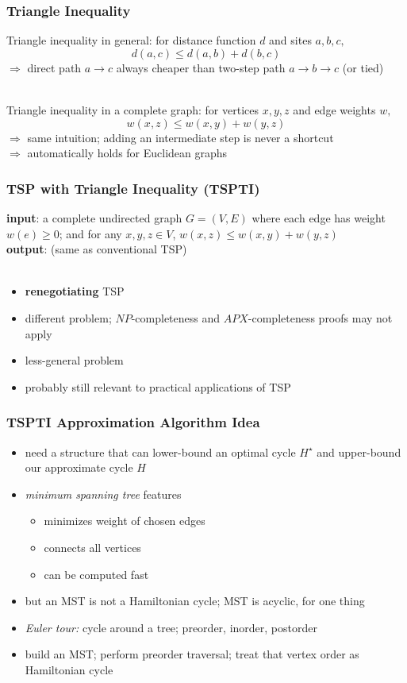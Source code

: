 \documentclass{beamer}
\newcommand{\stanza}{ \\~\ }
\begin{document}
\begin{frame} \frametitle{Triangle Inequality}
Triangle inequality in general: for distance function $d$ and sites $a, b, c,$
\[ d(a, c) \leq d(a, b) + d(b, c) \]
$\Rightarrow$ direct path $a \rightarrow c$ always cheaper than two-step path
$a \rightarrow b \rightarrow c$ (or tied) \stanza

Triangle inequality in a complete graph: for vertices $x, y, z$ and edge weights $w,$
\[ w(x, z) \leq w(x, y) + w(y, z) \]
$\Rightarrow$ same intuition; adding an intermediate step is never a shortcut \\
$\Rightarrow$ automatically holds for Euclidean graphs
\end{frame}

\begin{frame} \frametitle{TSP with Triangle Inequality (TSPTI)}

\textbf{input}: a complete undirected graph $G=(V,E)$ where each edge has weight $w(e) \geq 0$;
and for any $x, y, z \in V$, $w(x, z) \leq w(x, y) + w(y, z)$ \\
\textbf{output}: (same as conventional TSP) \stanza
\begin{itemize}
  \item \textbf{renegotiating} TSP
  \item different problem; $NP$-completeness and $APX$-completeness proofs may not apply
  \item less-general problem
  \item probably still relevant to practical applications of TSP
\end{itemize}
\end{frame}

\begin{frame} \frametitle{TSPTI Approximation Algorithm Idea}
\begin{itemize}
  \item need a structure that can lower-bound an optimal cycle $H^\star$ and upper-bound
    our approximate cycle $H$
  \item \emph{minimum spanning tree} features
  \begin{itemize}
    \item minimizes weight of chosen edges
    \item connects all vertices
    \item can be computed fast
  \end{itemize}
  \item but an MST is not a Hamiltonian cycle; MST is acyclic, for one thing
  \item \emph{Euler tour:} cycle around a tree; preorder, inorder, postorder
  \item build an MST; perform preorder traversal; treat that vertex order as Hamiltonian cycle
\end{itemize}
\end{frame}
\end{document}
